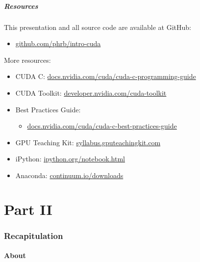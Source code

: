 \documentclass[10pt, compress]{beamer}
\begin{document}
\begin{frame}
    \frametitle{Resources}
    This presentation and all source code are available
    at \alert{GitHub}:

    \begin{itemize}
        \item \url{github.com/phrb/intro-cuda}
    \end{itemize}

    More resources:

    \begin{itemize}
        \item CUDA C: \url{docs.nvidia.com/cuda/cuda-c-programming-guide}
        \item CUDA Toolkit: \url{developer.nvidia.com/cuda-toolkit}
        \item Best Practices Guide:
            \begin{itemize}
                \item \url{docs.nvidia.com/cuda/cuda-c-best-practices-guide}
            \end{itemize}
        \item GPU Teaching Kit: \url{syllabus.gputeachingkit.com}
        \item iPython: \url{ipython.org/notebook.html}
        \item Anaconda: \url{continuum.io/downloads}
    \end{itemize}
\end{frame}

\part{Part II}

\maketitle

\section{Recapitulation}

\subsection{About}
\end{document}
